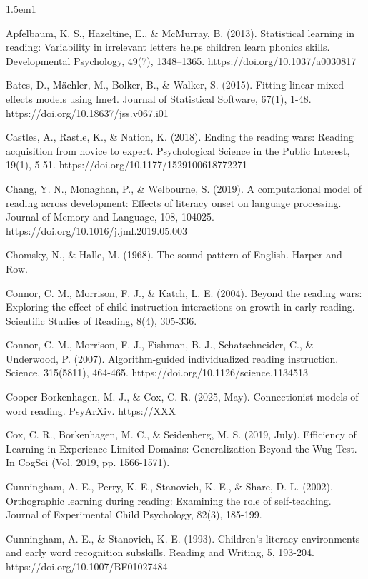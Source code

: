 \documentclass[
  ,man,floatsintext]{apa6}
\begin{document}
\begin{hangparas}{1.5em}{1}

Apfelbaum, K. S., Hazeltine, E., \& McMurray, B. (2013). Statistical learning in reading: Variability in irrelevant letters helps children learn phonics skills. Developmental Psychology, 49(7), 1348–1365. https://doi.org/10.1037/a0030817

Bates, D., Mächler, M., Bolker, B., \& Walker, S. (2015). Fitting linear mixed-effects models using lme4. Journal of Statistical Software, 67(1), 1-48. https://doi.org/10.18637/jss.v067.i01

Castles, A., Rastle, K., \& Nation, K. (2018). Ending the reading wars: Reading acquisition from novice to expert. Psychological Science in the Public Interest, 19(1), 5-51. https://doi.org/10.1177/1529100618772271

Chang, Y. N., Monaghan, P., \& Welbourne, S. (2019). A computational model of reading across development: Effects of literacy onset on language processing. Journal of Memory and Language, 108, 104025. https://doi.org/10.1016/j.jml.2019.05.003

Chomsky, N., \& Halle, M. (1968). The sound pattern of English. Harper and Row.

Connor, C. M., Morrison, F. J., \& Katch, L. E. (2004). Beyond the reading wars: Exploring the effect of child-instruction interactions on growth in early reading. Scientific Studies of Reading, 8(4), 305-336.

Connor, C. M., Morrison, F. J., Fishman, B. J., Schatschneider, C., \& Underwood, P. (2007). Algorithm-guided individualized reading instruction. Science, 315(5811), 464-465. https://doi.org/10.1126/science.1134513

Cooper Borkenhagen, M. J., \& Cox, C. R. (2025, May). Connectionist models of word reading. PsyArXiv. https://XXX

Cox, C. R., Borkenhagen, M. C., \& Seidenberg, M. S. (2019, July). Efficiency of Learning in Experience-Limited Domains: Generalization Beyond the Wug Test. In CogSci (Vol. 2019, pp. 1566-1571).

Cunningham, A. E., Perry, K. E., Stanovich, K. E., \& Share, D. L. (2002). Orthographic learning during reading: Examining the role of self-teaching. Journal of Experimental Child Psychology, 82(3), 185-199.

Cunningham, A. E., \& Stanovich, K. E. (1993). Children's literacy environments and early word recognition subskills. Reading and Writing, 5, 193-204. https://doi.org/10.1007/BF01027484


\end{hangparas}
\end{document}
